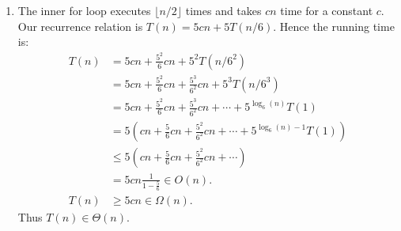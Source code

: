 \documentclass[10pt,oneside,reqno]{amsart}
\theoremstyle{plain}
\theoremstyle{definition}
\begin{document}
\begin{enumerate}[label=\arabic*.]
\item The inner for loop executes $\lfloor n/2 \rfloor$ times and takes $cn$ time for a constant $c$. Our recurrence relation is $T(n) = 5cn + 5T(n/6)$. Hence the running time is:
\begin{equation}
\begin{aligned}
T(n) &= 5 cn + \frac{5^2}{6}cn + 5^2T(n/6^2)\\
&= 5cn +  \frac{5^2}{6}cn +  \frac{5^3}{6^2}cn + 5^3T(n/6^3)\\
&= 5cn +  \frac{5^2}{6}cn +  \frac{5^3}{6^2}cn + \cdots + 5^{\log_6(n)}T(1)\\
&= 5\left( cn +  \frac{5}{6}cn +  \frac{5^2}{6^2}cn + \cdots + 5^{\log_6(n) - 1}T(1) \right) \\
&\leq  5\left( cn +  \frac{5}{6}cn +  \frac{5^2}{6^2}cn + \cdots \right) \\
&= 5cn \frac{1}{1 - \frac{5}{6}} \in O(n).\\
T(n) &\geq 5cn \in \Omega (n). 
\end{aligned}
\end{equation}
Thus $T(n) \in \Theta(n)$. 








 







\end{enumerate}
\end{document}
